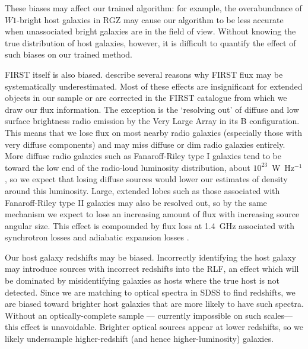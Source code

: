     These biases may affect our
    trained algorithm: for example, the overabundance of $W1$-bright host
    galaxies in RGZ may cause our algorithm to be less accurate when
    unassociated bright galaxies are in the field of view. Without knowing the true
    distribution of host galaxies, however, it is difficult to quantify the
    effect of such biases on our trained method.

    FIRST itself is also biased. \citet{helfand15first} describe several reasons why FIRST flux may be systematically underestimated. Most of these effects are insignificant for extended objects in our sample or are corrected in the FIRST catalogue from which we draw our flux information. The exception is the `resolving out' of diffuse and low surface brightness radio emission by the Very Large Array in its B configuration. This means that we lose flux on most nearby radio galaxies (especially those with very
    diffuse components) and may miss diffuse or dim radio galaxies entirely.
    More diffuse radio galaxies such as Fanaroff-Riley type I \citep[FRI;][]{Fanaroff1974} galaxies tend to
    be toward the low end of the radio-loud luminosity distribution, about
    $10^{23}$~W~Hz$^{-1}$ \citep{best09radio}, so we expect that losing
    diffuse sources would lower our estimates of density around this
    luminosity. Large, extended lobes such as those associated with Fanaroff-Riley type II \citep[FRII;][]{Fanaroff1974} galaxies may also be resolved out, so by the same mechanism we expect to lose an increasing amount of flux with increasing source angular size. This effect is compounded by flux loss at 1.4~GHz associated with synchrotron losses and adiabatic expansion losses \citep{blundell99doubles}.

    Our host galaxy redshifts may be biased. Incorrectly identifying the host galaxy may introduce sources with incorrect redshifts into the RLF, an effect which will be dominated by misidentifying galaxies as hosts where the true host is not detected. Since we are matching to optical spectra in SDSS to find
    redshifts, we are biased toward brighter host galaxies that are more
    likely to have such spectra. Without an optically-complete sample ---
    currently impossible on such scales---this effect is unavoidable.
    Brighter optical sources appear at lower redshifts, so we likely
    undersample higher-redshift (and hence higher-luminosity) galaxies.

